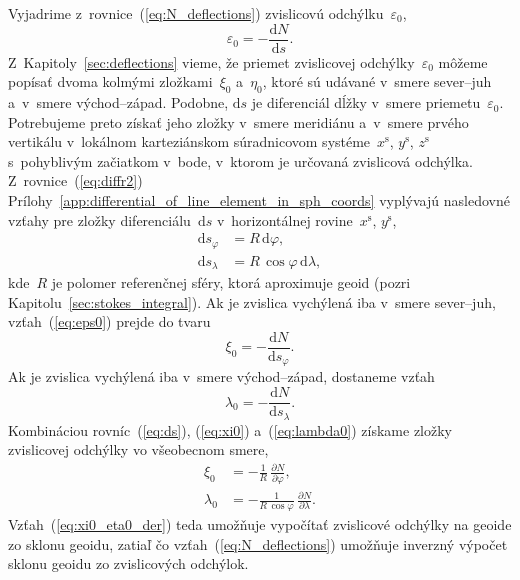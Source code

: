 \documentclass[a4paper,12pt]{book}
\newcommand{\diff}{\mathrm d}
\begin{document}
Vyjadrime z~rovnice~(\ref{eq:N_deflections}) zvislicovú 
odchýlku~$\varepsilon_0$,
%
\begin{equation}
\label{eq:eps0}
\varepsilon_0 = -\frac{\diff N}{\diff s}{.}
\end{equation}
%
Z~Kapitoly~\ref{sec:deflections} vieme, že priemet zvislicovej 
odchýlky~$\varepsilon_0$ môžeme popísať dvoma kolmými zložkami~$\xi_0$ 
a~$\eta_0$, ktoré sú udávané v~smere sever--juh a~v~smere východ--západ.  
Podobne, $\diff s$ je diferenciál dĺžky v~smere priemetu~$\varepsilon_0$.  
Potrebujeme preto získať jeho zložky v~smere meridiánu a~v~smere prvého 
vertikálu v~lokálnom karteziánskom súradnicovom systéme~$x^\mathrm{s}$, 
$y^\mathrm{s}$, $z^\mathrm{s}$ s~pohyblivým začiatkom v~bode, v~ktorom je 
určovaná zvislicová odchýlka.  Z~rovnice~(\ref{eq:diffr2}) 
Prílohy~\ref{app:differential_of_line_element_in_sph_coords} vyplývajú 
nasledovné vzťahy pre zložky diferenciálu~$\diff s$ v~horizontálnej 
rovine~$x^\mathrm{s}$, $y^\mathrm{s}$,
%
\begin{equation}
\label{eq:ds}
\begin{split}
\diff s_\varphi &= R \, \diff \varphi{,}\\
%
\diff s_\lambda &= R \, \cos\varphi \, \diff \lambda{,}
\end{split}
\end{equation}
%
kde~$R$ je polomer referenčnej sféry, ktorá aproximuje geoid (pozri 
Kapitolu~\ref{sec:stokes_integral}).  Ak je zvislica vychýlená iba v~smere 
sever--juh, vzťah~(\ref{eq:eps0}) prejde do tvaru
%
\begin{equation}
\label{eq:xi0}
\xi_0 = -\frac{\diff N}{\diff s_\varphi}{.}
\end{equation}
%
Ak je zvislica vychýlená iba v~smere východ--západ, dostaneme vzťah
%
\begin{equation}
\label{eq:lambda0}
\lambda_0 = -\frac{\diff N}{\diff s_\lambda}{.}
\end{equation}
%
Kombináciou rovníc~(\ref{eq:ds}), (\ref{eq:xi0}) a~(\ref{eq:lambda0}) získame 
zložky zvislicovej odchýlky vo všeobecnom smere,
%
\begin{equation}
\begin{split}
\label{eq:xi0_eta0_der}
\xi_0 &= -\frac{1}{R} \, \frac{\partial N}{\partial \varphi}{,}\\
%
\lambda_0 &= -\frac{1}{R \, \cos\varphi} \, \frac{\partial N}{\partial 
\lambda}{.}
\end{split}
\end{equation}
%
Vzťah~(\ref{eq:xi0_eta0_der}) teda umožňuje vypočítať zvislicové odchýlky na 
geoide zo sklonu geoidu, zatiaľ čo vzťah~(\ref{eq:N_deflections}) umožňuje 
inverzný výpočet sklonu geoidu zo zvislicových odchýlok.
\end{document}
